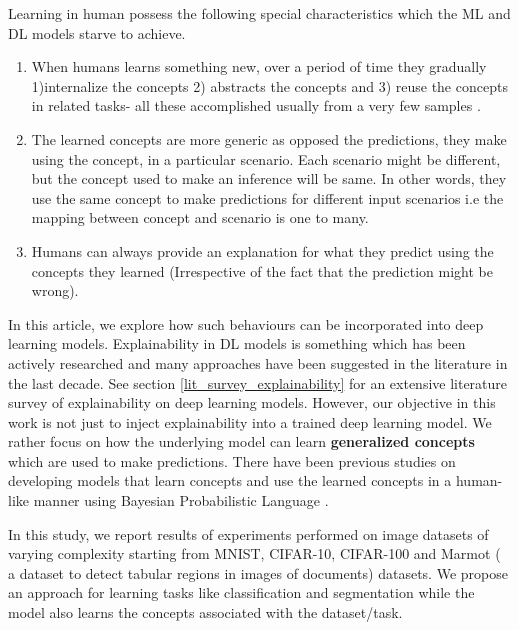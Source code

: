 \documentclass{JMLFS}
\begin{document}
Learning in human possess  the following special characteristics which the ML and DL models starve to achieve.
\begin{enumerate}

\item When humans learns something new, over a period of time they gradually  1)internalize the concepts 2) abstracts the concepts and 3) reuse the concepts in related tasks- all these accomplished usually from a very few samples \cite{lake2015}.

\item The learned concepts are more generic as opposed the predictions, they make using the concept, in a particular scenario.
Each scenario might be different, but the concept used to make an inference will be same.
In other words, they use the same concept to make predictions for different input scenarios i.e the mapping between concept and scenario is one to many.

\item Humans can always provide an explanation for what they predict using the concepts they learned (Irrespective of the fact that the prediction might be wrong).

\end{enumerate}
In this article, we explore how such behaviours can be incorporated into deep learning models. Explainability in DL models is something which has been actively researched and many approaches have been suggested in the literature in the last decade\cite{linardatos2021}. See section \ref{lit_survey_explainability} for an extensive literature survey of explainability on deep learning models. However, our objective in this work is not just to inject explainability into a trained deep learning model. We rather focus on how the underlying model can learn \textbf{generalized concepts}  which are used to make predictions. There have been previous studies \cite{lake2015} on developing models that learn concepts and use the learned concepts in a human-like manner using Bayesian Probabilistic Language \cite{tenenbaum2019}.

In this study, we report results of experiments performed on image datasets of varying complexity starting from MNIST, CIFAR-10, CIFAR-100 and Marmot ( a dataset to detect tabular regions in images of documents) \cite{fang2012} datasets. We propose an approach for learning tasks like classification and segmentation while the model also learns the concepts associated with the dataset/task.
\end{document}

